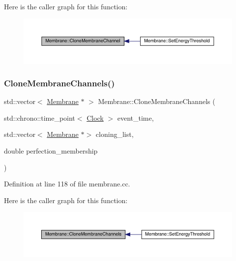 Here is the caller graph for this function\+:
\nopagebreak
\begin{figure}[H]
\begin{center}
\leavevmode
\includegraphics[width=350pt]{class_membrane_a9514ca4d4378e6467d2059a9d5f9b99b_icgraph}
\end{center}
\end{figure}
\mbox{\label{class_membrane_aa9958ea461092c0d2aceb07c9c34373c}} 
\subsubsection{\texorpdfstring{Clone\+Membrane\+Channels()}{CloneMembraneChannels()}}
{\footnotesize\ttfamily std\+::vector$<$ \hyperlink{class_membrane}{Membrane} $\ast$ $>$ Membrane\+::\+Clone\+Membrane\+Channels (\begin{DoxyParamCaption}\item[{std\+::chrono\+::time\+\_\+point$<$ \hyperlink{universe_8h_a0ef8d951d1ca5ab3cfaf7ab4c7a6fd80}{Clock} $>$}]{event\+\_\+time,  }\item[{std\+::vector$<$ \hyperlink{class_membrane}{Membrane} $\ast$$>$}]{cloning\+\_\+list,  }\item[{double}]{perfection\+\_\+membership }\end{DoxyParamCaption})}



Definition at line 118 of file membrane.\+cc.

Here is the caller graph for this function\+:
\nopagebreak
\begin{figure}[H]
\begin{center}
\leavevmode
\includegraphics[width=350pt]{class_membrane_aa9958ea461092c0d2aceb07c9c34373c_icgraph}
\end{center}
\end{figure}
\mbox{\label{class_membrane_a589b56529ac634a52b2a5fc78d356973}} 
